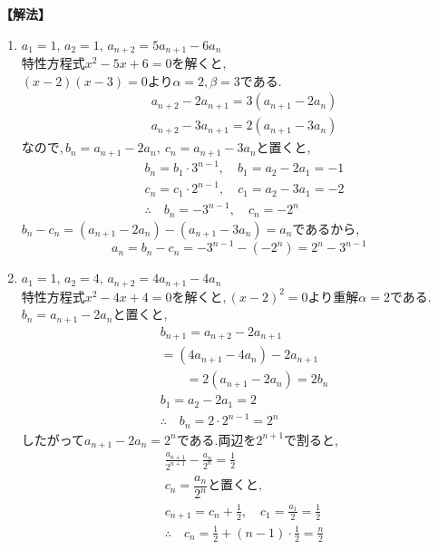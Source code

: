 \documentclass[dvipdfmx,a4paper,11pt,fleqn,openany]{jsbook}
\begin{document}
      \noindent\textbf{【解法】}
      \begin{enumerate}[label=(\arabic*),parsep=3pt]
        \item $\displaystyle a_1=1,\,a_2=1,\, a_{n+2}=5a_{n+1}-6a_n$\\
              特性方程式$x^2-5x+6=0$を解くと,\\
              $(x-2)(x-3)=0$より$\alpha=2,\beta=3$である.
              \begin{align*}
                &a_{n+2}-2a_{n+1}=3(a_{n+1}-2a_n)\\
                &a_{n+2}-3a_{n+1}=2(a_{n+1}-3a_n)
              \end{align*}
              なので,\,$b_n=a_{n+1}-2a_n,\ c_n=a_{n+1}-3a_n$と置くと,
              \begin{align*}
                &b_n=b_1\cdot3^{n-1},\quad b_1=a_2-2a_1=-1\\
                &c_n=c_1\cdot2^{n-1},\quad c_1=a_2-3a_1=-2\\
                &\therefore \quad b_n=-3^{n-1},\quad c_n=-2^n
              \end{align*}
              $b_n-c_n=(a_{n+1}-2a_n)-(a_{n+1}-3a_n)=a_n$であるから,
              \[
                a_n=b_n-c_n=-3^{n-1}-(-2^n)=2^n-3^{n-1}
              \]
        \item $\displaystyle a_1=1,\,a_2=4,\, a_{n+2}=4a_{n+1}-4a_n$\\
              特性方程式$x^2-4x+4=0$を解くと,\,$(x-2)^2=0$より重解$\alpha=2$である.
              \,$b_n=a_{n+1}-2a_n$と置くと,
              \begin{align*}
                &b_{n+1}=a_{n+2}-2a_{n+1}\\
                &=(4a_{n+1}-4a_n)-2a_{n+1}\\
                &\qquad=2(a_{n+1}-2a_n)=2b_n\\
                &b_1=a_2-2a_1=2\\
                &\therefore \quad b_n=2\cdot2^{n-1}=2^n
              \end{align*}
              したがって$a_{n+1}-2a_n=2^n$である.両辺を$2^{n+1}$で割ると,
              \begin{align*}
                &\frac{a_{n+1}}{2^{n+1}}-\frac{a_n}{2^n}=\frac12\\
                &\text{$c_n=\dfrac{a_n}{2^n}$と置くと,}\\
                &c_{n+1}=c_n+\frac12,\quad c_1=\frac{a_1}{2}=\frac12\\
                &\therefore \quad c_n=\frac12+(n-1)\cdot\frac12=\frac n2\\

\end{align*}
\end{enumerate}
\end{document}
